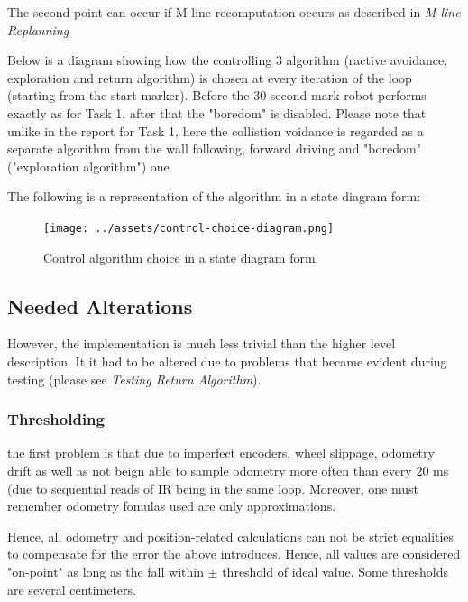 \documentclass[11pt, a4paper]{article}
\begin{document}
The second point can occur if M-line recomputation occurs as described in \textit{M-line Replanning}

Below is a diagram showing how the controlling $3$ algorithm (ractive avoidance, exploration and return algorithm)
is chosen at every iteration of the loop (starting from the start marker). Before the 30 second mark robot
performs exactly as for Task 1, after that the "boredom"\cite{task1_report} is disabled. Please note
that unlike in the report for Task 1, here the collistion voidance is regarded as a separate algorithm from the
wall following, forward driving and "boredom" ("exploration algorithm") one

The following is a representation of the algorithm in a state diagram form:
\begin{figure}[h]
  \begin{center}
    \texttt{[image: ../assets/control-choice-diagram.png]}
    \caption{Control algorithm choice in a state diagram form.}
  \end{center}
\end{figure} 



\subsection{Needed Alterations}

However, the implementation is much less trivial than the higher level description. It it had 
to be altered due to problems that became evident during testing (please see \textit{Testing Return Algorithm}).

\subsubsection{Thresholding}



the first problem is that due to imperfect encoders, wheel slippage, odometry drift as well as not
beign able to sample odometry more often than every $20$ ms\cite{khepera_manual} (due to sequential 
reads of IR being in the same loop. Moreover, one must remember odometry fomulas used are only approximations.

Hence, all odometry and position-related calculations can not be strict equalities to compensate 
for the error the above introduces. Hence, all values are considered "on-point" as long as the 
fall within $\pm$ threshold of ideal value. Some thresholds are several centimeters.
\end{document}
